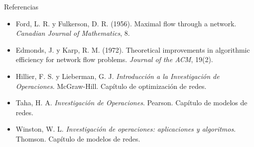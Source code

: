 \documentclass[aspectratio=169]{beamer}
\begin{document}
\begin{frame}{Referencias}
  \small
  \begin{itemize}\setlength{\itemsep}{0.5em}
    \item Ford, L. R. y Fulkerson, D. R. (1956). Maximal flow through a network. \textit{Canadian Journal of Mathematics}, 8.
    \item Edmonds, J. y Karp, R. M. (1972). Theoretical improvements in algorithmic efficiency for network flow problems. \textit{Journal of the ACM}, 19(2).
    \item Hillier, F. S. y Lieberman, G. J. \textit{Introducción a la Investigación de Operaciones}. McGraw-Hill. Capítulo de optimización de redes.
    \item Taha, H. A. \textit{Investigación de Operaciones}. Pearson. Capítulo de modelos de redes.
    \item Winston, W. L. \textit{Investigación de operaciones: aplicaciones y algoritmos}. Thomson. Capítulo de modelos de redes.
  \end{itemize}
\end{frame}
\end{document}
